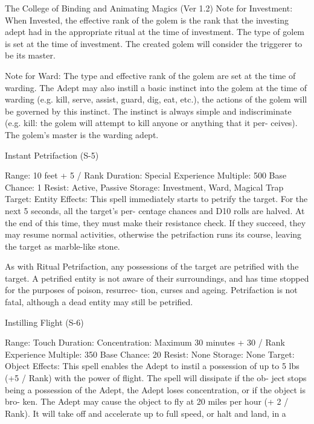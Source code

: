 \begin{Chapter}{The College of Binding and Animating Magics (Ver 1.2)}
Note  for  Investment:  When  Invested,  the  effective 
rank  of  the  golem  is  the  rank  that  the  investing 
adept  had  in  the  appropriate  ritual  at  the  time  of 
investment. The type of golem is set at the time of 
investment.  The  created  golem  will  consider  the 
triggerer to be its master. 

Note for Ward:  The type and effective rank of the 
golem  are  set  at  the  time  of  warding.  The  Adept 
may  also  instill  a  basic  instinct  into  the  golem  at 
the  time  of  warding  (e.g.  kill,  serve,  assist,  guard, 
dig,  eat,  etc.),  the  actions  of  the  golem  will  be 
governed  by  this  instinct.  The  instinct  is  always 
simple and indiscriminate (e.g. kill: the golem will 
attempt  to  kill  anyone  or  anything  that  it  per-
ceives). The golem’s master is the warding adept. 

Instant Petrifaction (S-5) 

Range: 10 feet + 5 / Rank 
Duration: Special 
Experience Multiple: 500 
Base Chance: 1%
Resist: Active, Passive 
Storage: Investment, Ward, Magical Trap 
Target: Entity 
Effects: This spell immediately starts to petrify the 
target.  For  the  next 5  seconds, all  the  target’s  per-
centage  chances  and  D10  rolls  are  halved.  At  the 
end  of  this  time,  they  must  make  their  resistance 
check.  If  they  succeed,  they  may  resume  normal 
activities, otherwise the petrifaction runs its course, 
leaving the target as marble-like stone. 

As with Ritual Petrifaction, any possessions of the 
target  are  petrified  with  the  target.  A  petrified 
entity  is  not  aware  of  their  surroundings,  and  has 
time  stopped  for  the  purposes  of  poison,  resurrec-
tion,  curses  and  ageing.  Petrifaction  is  not  fatal, 
although a dead entity may still be petrified. 

Instilling Flight (S-6) 

Range: Touch 
Duration:  Concentration:  Maximum  30  minutes  + 
30 / Rank 
Experience Multiple: 350 
Base Chance: 20%
Resist: None 
Storage: None 
Target: Object 
Effects:  This  spell  enables  the  Adept  to  instil  a 
possession  of  up  to  5  lbs  (+5  /  Rank)  with  the 
power  of  flight.  The  spell  will  dissipate  if  the  ob-
ject  stops  being  a  possession  of  the  Adept,  the 
Adept  loses  concentration,  or  if  the  object  is  bro-
ken.  The  Adept  may  cause  the  object  to  fly  at  20 
miles  per  hour  (+  2  /  Rank).  It  will  take  off  and 
accelerate  up  to  full  speed,  or  halt  and  land,  in  a 


\end{Chapter}

